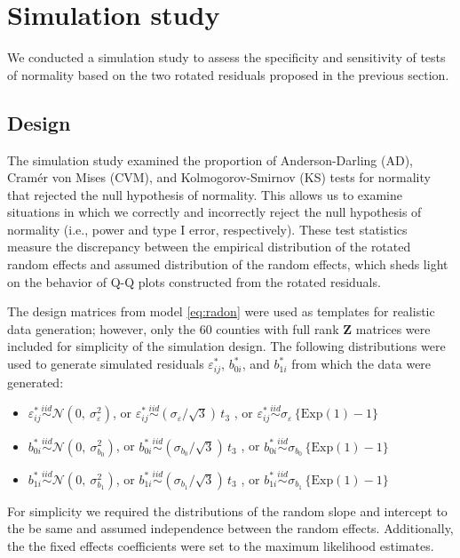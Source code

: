 \documentclass[12pt]{article} %
\begin{document}
\section{Simulation study}\label{sec:simulation}

We conducted a simulation study to assess the specificity and sensitivity of tests of normality based on the two rotated residuals proposed in the previous section. 

\subsection{Design}\label{sec:sim-design}

The simulation study examined the proportion of Anderson-Darling (AD), Cram{\'e}r von Mises (CVM), and Kolmogorov-Smirnov (KS) tests for normality that rejected the null hypothesis of normality. This allows us to examine situations in which we correctly and incorrectly reject the null hypothesis of normality (i.e., power and type I error, respectively).  These test statistics measure the discrepancy between the empirical distribution of the rotated random effects and assumed distribution of the random effects, which sheds light on the behavior of Q-Q plots constructed from the rotated residuals. 

The design matrices from model \eqref{eq:radon} were used as templates for realistic data generation; however, only the 60 counties with full rank $\bm{Z}$ matrices were included for simplicity of the simulation design.
The following distributions were used to generate simulated residuals $\varepsilon_{ij}^*$, $b_{0i}^*$, and $b_{1i}^*$ from which the data were generated:
%
\begin{itemize}
\item $\varepsilon_{ij}^* \overset{iid}{\sim} \mathcal{N}(0, \ \sigma^2_{\varepsilon})$, or $\varepsilon_{ij}^* \overset{iid}{\sim} (\sigma_{\varepsilon} / \sqrt{3})\, t_3$ , or $\varepsilon_{ij}^* \overset{iid}{\sim} \sigma_{\varepsilon} \, \{ \text{Exp}(1) - 1 \}$

\item $b_{0i}^* \overset{iid}{\sim} \mathcal{N}(0, \ \sigma^2_{b_{0}})$, or $b_{0i}^* \overset{iid}{\sim} (\sigma_{b_{0}} / \sqrt{3})\, t_3$ , or $b_{0i}^* \overset{iid}{\sim} \sigma_{b_{0}} \, \{ \text{Exp}(1) - 1 \}$

\item $b_{1i}^* \overset{iid}{\sim} \mathcal{N}(0, \ \sigma^2_{b_{1}})$, or $b_{1i}^* \overset{iid}{\sim} (\sigma_{b_{1}} / \sqrt{3})\, t_3$ , or $b_{1i}^* \overset{iid}{\sim} \sigma_{b_{1}} \, \{ \text{Exp}(1) - 1 \}$
\end{itemize}
%
For simplicity we required the distributions of the random slope and intercept to the be same and assumed independence between the random effects. Additionally, the the fixed effects coefficients were set to the maximum likelihood estimates.
\end{document}
